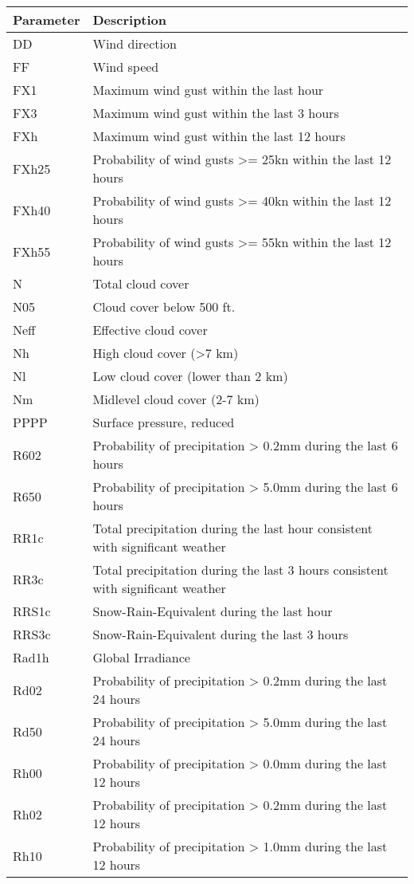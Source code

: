 \documentclass[class=scrbook, crop=false]{standalone}
\begin{document}
\begin{table}[]
\begin{tabular}{l|l}
Parameter & Description \\\hline
DD & Wind direction\\
FF & Wind speed\\
FX1 & Maximum wind gust within the last hour\\
FX3 & Maximum wind gust within the last 3 hours\\
FXh & Maximum wind gust within the last 12 hours\\
FXh25 & Probability of wind gusts >= 25kn within the last 12 hours\\
FXh40 & Probability of wind gusts >= 40kn within the last 12 hours\\
FXh55 & Probability of wind gusts >= 55kn within the last 12 hours\\
N & Total cloud cover\\
N05 & Cloud cover below 500 ft.\\
Neff & Effective cloud cover\\
Nh & High cloud cover (>7 km)\\
Nl & Low cloud cover (lower than 2 km)\\
Nm & Midlevel cloud cover (2-7 km)\\
PPPP & Surface pressure, reduced\\
R602 & Probability of precipitation > 0.2mm during the last 6 hours\\
R650 & Probability of precipitation > 5.0mm during the last 6 hours\\
RR1c & Total precipitation during the last hour consistent with significant weather\\
RR3c & Total precipitation during the last 3 hours consistent with significant weather\\
RRS1c & Snow-Rain-Equivalent during the last hour\\
RRS3c & Snow-Rain-Equivalent during the last 3 hours\\
Rad1h & Global Irradiance\\
Rd02 & Probability of precipitation > 0.2mm during the last 24 hours\\
Rd50 & Probability of precipitation > 5.0mm during the last 24 hours\\
Rh00 & Probability of precipitation > 0.0mm during the last 12 hours\\
Rh02 & Probability of precipitation > 0.2mm during the last 12 hours\\
Rh10 & Probability of precipitation > 1.0mm during the last 12 hours\\

\end{tabular}
\end{table}
\end{document}
